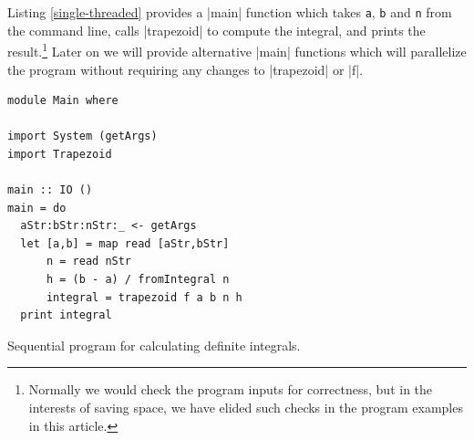 \documentclass{tmr}
\begin{document}
Listing \ref{single-threaded} provides a |main| function which takes
\verb|a|, \verb|b| and \verb|n| from the command line, calls |trapezoid| to compute the integral, and prints
the result.\footnote{Normally we would check the program inputs for correctness, but in
the interests of saving space, we have elided such checks in the program examples in this article.}
Later on we will provide alternative |main| functions which will parallelize the program
without requiring any changes to |trapezoid| or |f|.

\begin{listing}
\begin{Verbatim}
module Main where

import System (getArgs)
import Trapezoid

main :: IO ()
main = do
  aStr:bStr:nStr:_ <- getArgs
  let [a,b] = map read [aStr,bStr]
      n = read nStr
      h = (b - a) / fromIntegral n
      integral = trapezoid f a b n h
  print integral 
\end{Verbatim}
\caption{Sequential program for calculating definite integrals. \label{single-threaded}}
\end{listing}


%


\end{document}

